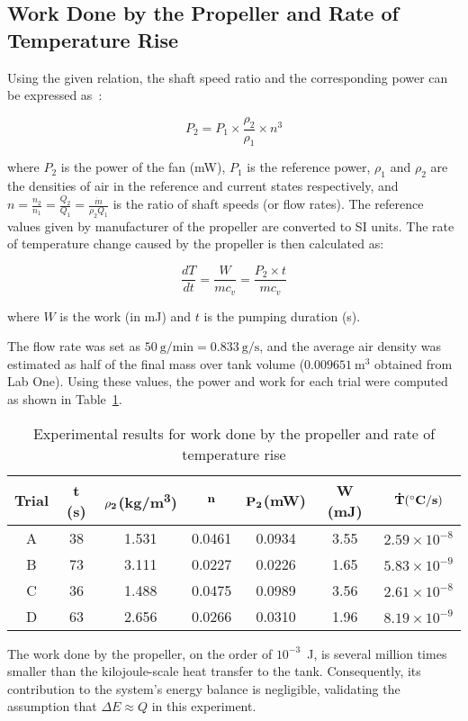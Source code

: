 \documentclass[12pt]{article}
\begin{document}
\subsection*{Work Done by the Propeller and Rate of Temperature Rise}

Using the given relation, the shaft speed ratio and the corresponding power can be expressed as~\cite{che260_manual}:

\begin{equation}
    P_{2} = P_{1} \times \frac{\rho_{2}}{\rho_{1}} \times n^{3}
\end{equation}

where \( P_{2} \) is the power of the fan (mW), \( P_{1} \) is the reference power, \( \rho_{1} \) and \( \rho_{2} \) are the densities of air in the reference and current states respectively, and \( n = \frac{n_{2}}{n_{1}} = \frac{Q_{2}}{Q_{1}} = \frac{\dot m}{\rho_2 Q_1}\) is the ratio of shaft speeds (or flow rates).  The reference values given by manufacturer of the propeller are converted to SI units.
The rate of temperature change caused by the propeller is then calculated as:

\begin{equation}
    \frac{dT}{dt} = \frac{W}{mc_v} = \frac{P_{2} \times t}{mc_v}
\end{equation}

where \( W \) is the work (in mJ) and \( t \) is the pumping duration (s).

The flow rate was set as \( 50~\text{g/min} = 0.833~\text{g/s} \), and the average air density was estimated as half of the final mass over tank volume (\( 0.009651~\text{m}^{3} \) obtained from Lab One). Using these values, the power and work for each trial were computed as shown in Table~\ref{tab:results}.

\begin{table}[h!]
\centering
\caption{Experimental results for work done by the propeller and rate of temperature rise}
\label{tab:results}
\begin{tabular}{|c|c|c|c|c|c|c|}
\hline
\textbf{Trial} & \textbf{\bf t (s)} & \textbf{$\bf \rho_2$(kg/m\textsuperscript{3})} & \textbf{$\bf n$} & \textbf{$\bf P_2$(mW)} & \textbf{W (mJ)} & $\bf \dot T (^{\circ} C/s)$ \\ \hline
A & 38 & 1.531 & 0.0461 & 0.0934 & 3.55 & $2.59\times10^{-8}$\\ \hline
B & 73 & 3.111 & 0.0227 & 0.0226 & 1.65 & $5.83\times10^{-9}$\\ \hline
C & 36 & 1.488 & 0.0475 & 0.0989 & 3.56 & $2.61\times10^{-8}$\\ \hline
D & 63 & 2.656 & 0.0266 & 0.0310 & 1.96 & $8.19\times10^{-9}$\\ \hline
\end{tabular}
\end{table}
The work done by the propeller, on the order of $10^{-3}$~J, is several million times smaller than 
the kilojoule-scale heat transfer to the tank. Consequently, its contribution to the system’s 
energy balance is negligible, validating the assumption that $\Delta E \approx Q$ in this experiment.
\end{document}
